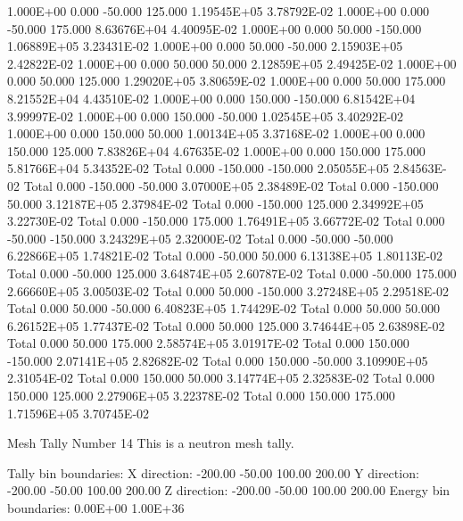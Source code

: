   1.000E+00     0.000   -50.000   125.000 1.19545E+05 3.78792E-02
  1.000E+00     0.000   -50.000   175.000 8.63676E+04 4.40095E-02
  1.000E+00     0.000    50.000  -150.000 1.06889E+05 3.23431E-02
  1.000E+00     0.000    50.000   -50.000 2.15903E+05 2.42822E-02
  1.000E+00     0.000    50.000    50.000 2.12859E+05 2.49425E-02
  1.000E+00     0.000    50.000   125.000 1.29020E+05 3.80659E-02
  1.000E+00     0.000    50.000   175.000 8.21552E+04 4.43510E-02
  1.000E+00     0.000   150.000  -150.000 6.81542E+04 3.99997E-02
  1.000E+00     0.000   150.000   -50.000 1.02545E+05 3.40292E-02
  1.000E+00     0.000   150.000    50.000 1.00134E+05 3.37168E-02
  1.000E+00     0.000   150.000   125.000 7.83826E+04 4.67635E-02
  1.000E+00     0.000   150.000   175.000 5.81766E+04 5.34352E-02
   Total        0.000  -150.000  -150.000 2.05055E+05 2.84563E-02
   Total        0.000  -150.000   -50.000 3.07000E+05 2.38489E-02
   Total        0.000  -150.000    50.000 3.12187E+05 2.37984E-02
   Total        0.000  -150.000   125.000 2.34992E+05 3.22730E-02
   Total        0.000  -150.000   175.000 1.76491E+05 3.66772E-02
   Total        0.000   -50.000  -150.000 3.24329E+05 2.32000E-02
   Total        0.000   -50.000   -50.000 6.22866E+05 1.74821E-02
   Total        0.000   -50.000    50.000 6.13138E+05 1.80113E-02
   Total        0.000   -50.000   125.000 3.64874E+05 2.60787E-02
   Total        0.000   -50.000   175.000 2.66660E+05 3.00503E-02
   Total        0.000    50.000  -150.000 3.27248E+05 2.29518E-02
   Total        0.000    50.000   -50.000 6.40823E+05 1.74429E-02
   Total        0.000    50.000    50.000 6.26152E+05 1.77437E-02
   Total        0.000    50.000   125.000 3.74644E+05 2.63898E-02
   Total        0.000    50.000   175.000 2.58574E+05 3.01917E-02
   Total        0.000   150.000  -150.000 2.07141E+05 2.82682E-02
   Total        0.000   150.000   -50.000 3.10990E+05 2.31054E-02
   Total        0.000   150.000    50.000 3.14774E+05 2.32583E-02
   Total        0.000   150.000   125.000 2.27906E+05 3.22378E-02
   Total        0.000   150.000   175.000 1.71596E+05 3.70745E-02

 Mesh Tally Number        14
 This is a neutron mesh tally.

 Tally bin boundaries:
    X direction:   -200.00    -50.00    100.00    200.00
    Y direction:   -200.00    -50.00    100.00    200.00
    Z direction:   -200.00    -50.00    100.00    200.00
    Energy bin boundaries: 0.00E+00 1.00E+36

